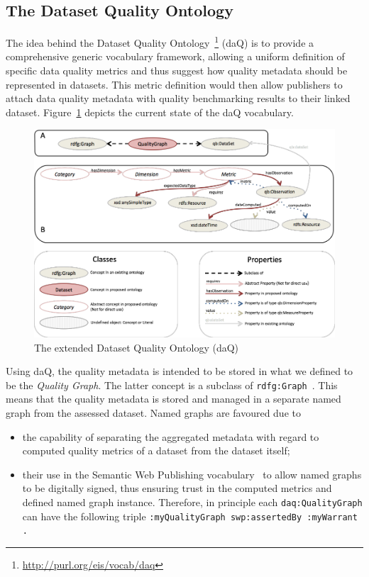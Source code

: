 
\subsection{The Dataset Quality Ontology}
\label{sec:DAQ} 
The idea behind the Dataset Quality Ontology~\cite{DebattistaEtAl:daQ:LDOW:2014}\footnote{\url{http://purl.org/eis/vocab/daq}} (daQ) is to provide a comprehensive generic vocabulary framework, allowing a uniform definition of specific data quality metrics and thus suggest how quality metadata should be represented in datasets.
This metric definition would then allow publishers to attach data quality metadata with quality benchmarking results to their linked dataset.
Figure~\ref{fig:daqExtended} depicts the current state of the daQ vocabulary.

\begin{figure}[tbph]
\center
\includegraphics[width=.85\textwidth]{images/daq_extendedframework.png} 
\caption{The extended Dataset Quality Ontology (daQ)}
\label{fig:daqExtended}
\end{figure}	

Using daQ, the quality metadata is intended to be stored in what we defined to be the \emph{Quality Graph}.
The latter concept is a subclass of \texttt{rdfg:Graph}~\cite{CBHS:NamedGraphs2005}.
This means that the quality metadata is stored and managed in a separate named graph from the assessed dataset.
Named graphs are favoured due to
\begin{itemize}
\item the capability of separating the aggregated metadata with regard to computed quality metrics of a dataset from the dataset itself;
\item their use in the Semantic Web Publishing vocabulary~\cite{conf/semweb/CarrollBHS04} to allow named graphs to be digitally signed, thus ensuring trust in the computed metrics and defined named graph instance. Therefore, in principle each \texttt{daq:QualityGraph} can have the following triple \texttt{:myQualityGraph swp:assertedBy :myWarrant .}
\end{itemize}

